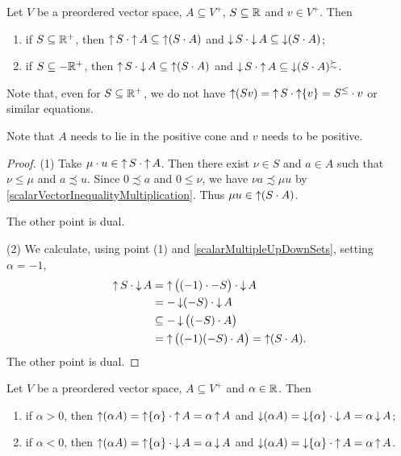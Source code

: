 \begin{lemma}
Let $V$ be a preordered vector space, $A\subseteq V^+$, $S\subseteq \mathbb{R}$ and $v\in V^+$. Then
\begin{enumerate}
\item if $S \subseteq \mathbb{R}^+$, then $\operatorname{\uparrow} S \cdot \operatorname{\uparrow} A \subseteq \operatorname{\uparrow} (S\cdot A)$ and $\operatorname{\downarrow} S\cdot \operatorname{\downarrow} A \subseteq \operatorname{\downarrow}(S\cdot A)$;
\item if $S \subseteq -\mathbb{R}^+$, then $\operatorname{\uparrow} S \cdot \operatorname{\downarrow} A \subseteq \operatorname{\uparrow}(S\cdot A)$ and $\operatorname{\downarrow} S \cdot \operatorname{\uparrow} A \subseteq \operatorname{\downarrow}(S\cdot A)^\succsim$.
\end{enumerate}
Note that, even for $S\subseteq \mathbb{R}^+$, we do not have $\operatorname{\uparrow} (Sv) = \operatorname{\uparrow} S\cdot \operatorname{\uparrow} \{v\} = S^\leq \cdot v$ or similar equations.
\end{lemma}
Note that $A$ needs to lie in the positive cone and $v$ needs to be positive.
\begin{proof}
(1) Take $\mu \cdot u \in \operatorname{\uparrow} S \cdot \operatorname{\uparrow} A$. Then there exist $\nu\in S$ and $a\in A$ such that $\nu \leq \mu$ and $a \precsim u$. Since $0\precsim a$ and $0\leq \nu$, we have $\nu a \precsim \mu u$  by \ref{scalarVectorInequalityMultiplication}.
Thus $\mu u \in \operatorname{\uparrow} (S\cdot A)$.

The other point is dual.

(2) We calculate, using point (1) and \ref{scalarMultipleUpDownSets}, setting $\alpha = -1$,
\begin{align*}
\operatorname{\uparrow} S \cdot \operatorname{\downarrow} A &= \operatorname{\uparrow}\big((-1)\cdot -S\big) \cdot \operatorname{\downarrow} A \\
&= -\operatorname{\downarrow}(-S) \cdot \operatorname{\downarrow} A \\
&\subseteq - \operatorname{\downarrow}\big((-S)\cdot A\big) \\
&= \operatorname{\uparrow}\big((-1)(-S)\cdot A\big) = \operatorname{\uparrow} (S\cdot A).
\end{align*}
The other point is dual.
\end{proof}
\begin{corollary} \label{scalarMultipleUpDownSetPositiveSet}
Let $V$ be a preordered vector space, $A\subseteq V^+$ and $\alpha\in \mathbb{R}$. Then
\begin{enumerate}
\item if $\alpha > 0$, then $\operatorname{\uparrow} (\alpha A) = \operatorname{\uparrow}\{\alpha\}\cdot \operatorname{\uparrow} A = \alpha \operatorname{\uparrow} A$ and $\operatorname{\downarrow}(\alpha A) = \operatorname{\downarrow}\{\alpha\}\cdot \operatorname{\downarrow} A = \alpha \operatorname{\downarrow} A$;
\item if $\alpha < 0$, then $\operatorname{\uparrow} (\alpha A) = \operatorname{\uparrow}\{\alpha\}\cdot \operatorname{\downarrow} A = \alpha \operatorname{\downarrow} A$ and $\operatorname{\downarrow}(\alpha A) = \operatorname{\downarrow}\{\alpha\} \cdot \operatorname{\uparrow} A = \alpha \operatorname{\uparrow} A$.
\end{enumerate}
\end{corollary}
